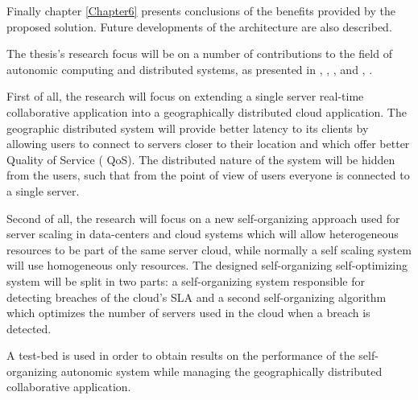 Finally chapter \ref{Chapter6} presents conclusions of the benefits provided by the proposed solution. Future developments of the architecture are also described.

The thesis's research focus will be on a number of contributions to the field of autonomic computing and distributed systems, as presented in \cite{bogdan:lindi}, \cite{bogdan:amgcc2013}, \cite{bogdan:cts2012}, \cite{bogdan:conti2010} and , \cite{bogdan:miles2012chapter}. 

First of all, the research will focus on extending a single server real-time collaborative application into a geographically distributed cloud application. The geographic distributed system will provide better latency to its clients by allowing users to connect to servers closer to their location and which offer better Quality of Service ( QoS). The distributed nature of the system will be hidden from the users, such that from the point of view of users everyone is connected to a single server.

Second of all, the research will focus on a new self-organizing approach used for server scaling in data-centers and cloud systems which will allow heterogeneous resources to be part of the same server cloud, while normally a self scaling system will use homogeneous only resources. The designed self-organizing self-optimizing system will be split in two parts: a self-organizing system responsible for detecting breaches of the cloud's SLA and a second self-organizing algorithm which optimizes the number of servers used in the cloud when a breach is detected.

A test-bed is used in order to obtain results on the performance of the self-organizing autonomic system while managing the geographically distributed collaborative application.